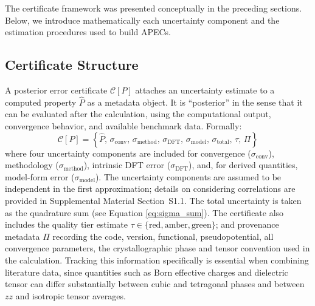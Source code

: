 \documentclass[prb,twocolumn,superscriptaddress,amsmath,amssymb,longbibliography]{revtex4-2}
\newcommand{\conv}{\mathrm{conv}}
\newcommand{\meth}{\mathrm{method}}
\newcommand{\cert}{\mathcal{C}}
\begin{document}
The certificate framework was presented conceptually in the preceding sections. Below, we introduce mathematically each uncertainty component and the estimation procedures used to build APECs.



\subsection{Certificate Structure}
\label{sec:cert_structure}

A posterior error certificate $\cert[P]$ attaches an uncertainty estimate to a computed property $\hat{P}$ as a metadata object. It is ``posterior'' in the sense that it can be evaluated after the calculation, using 
the computational output, convergence behavior, 
and available benchmark data. Formally:
\begin{equation}
    \cert[P] = \left\{ \hat{P}, \, \sigma_\conv, \, \sigma_\meth, \, 
    \sigma_{\mathrm{DFT}}, \, \sigma_{\mathrm{model}}, \, \sigma_{\mathrm{total}}, \, 
    \tau, \, \Pi \right\}
    \label{eq:certificate}
\end{equation}
where four uncertainty 
components are included for convergence ($\sigma_\conv$), methodology ($\sigma_\meth$), 
intrinsic DFT error ($\sigma_{\mathrm{DFT}}$), and, for derived quantities,  
model-form error ($\sigma_{\mathrm{model}}$). The uncertainty components are assumed to be independent in the first approximation; details on considering correlations are provided in Supplemental Material Section~S1.1. The total uncertainty is taken as the quadrature sum (see Equation \ref{eq:sigma_sum}).
The certificate also includes the quality tier estimate
$\tau \in \{\text{red}, \text{amber}, \text{green}\}$; and provenance 
metadata $\Pi$ recording the code, version, functional, pseudopotential, 
all convergence parameters, the 
crystallographic phase and tensor convention used in the calculation. 
Tracking this information specifically is essential when combining literature data, since quantities such as Born effective charges and dielectric tensor can differ substantially between cubic and tetragonal phases and between $zz$ and isotropic tensor averages.  
\end{document}
